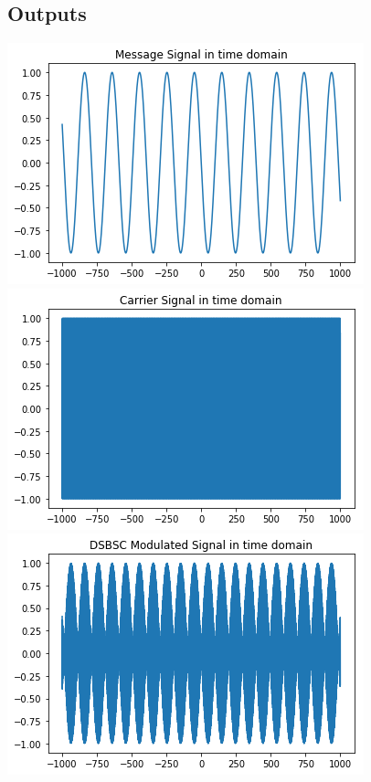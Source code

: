 \documentclass[12pt,a4paper]{article}%
\begin{document}
\begin{flushleft}
		\subsection{Outputs}
		\begin{center}
			{\includegraphics[width=0.80 \textwidth]{./images/m_sig.PNG}}\\\bigskip
			{\includegraphics[width=0.80 \textwidth]{./images/c_sig.PNG}}
			{\includegraphics[width=0.80 \textwidth]{./images/modu_sig.PNG}}\\\bigskip

\end{center}
\end{flushleft}
\end{document}
